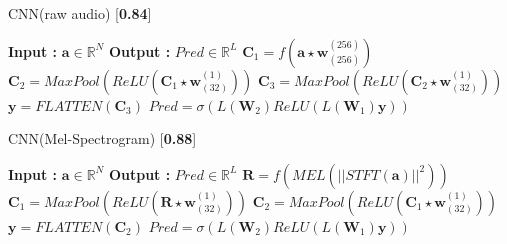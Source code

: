 \begin{minipage}[t]{7.5cm}
  \vspace{0pt}  
  \begin{algorithm}[H]
    \caption{CNN(raw audio) [\textbf{0.84}]}
    \begin{algorithmic}[1]
      \Statex \textbf{Input :} $\textbf{a} \in \mathbb{R}^{N}$
      \Statex \textbf{Output :} $Pred \in \mathbb{R}^{L}$ 
      \State $\textbf{C}_{1}  = f(\textbf{a}\star\textbf{w}_{(256)}^{(256)})$
      \State $\textbf{C}_{2} =  MaxPool(ReLU(\textbf{C}_{1}\star\textbf{w}_{(32)}^{(1)}))$
       \State $\textbf{C}_{3} = MaxPool(ReLU(\textbf{C}_{2}\star\textbf{w}_{(32)}^{(1)}))$
       \State $\textbf{y} = FLATTEN(\textbf{C}_{3})$
       \State $Pred = \sigma(L(\textbf{W}_{2})ReLU(L(\textbf{W}_{1})\textbf{y}))$
   \end{algorithmic}
  \end{algorithm}
\end{minipage}%
\begin{minipage}[t]{7.5cm}
  \vspace{0pt}
  \begin{algorithm}[H]
    \caption{CNN(Mel-Spectrogram) [\textbf{0.88}]}
     \begin{algorithmic}[1]
      \Statex \textbf{Input :} $\textbf{a} \in \mathbb{R}^{N}$
      \Statex \textbf{Output :} $Pred \in \mathbb{R}^{L}$ 
      \State $\textbf{R}  = f(MEL(||STFT(\textbf{a})||^{2}))$
      \State $\textbf{C}_{1} =  MaxPool(ReLU(\textbf{R}\star\textbf{w}_{(32)}^{(1)}))$
       \State $\textbf{C}_{2} = MaxPool(ReLU(\textbf{C}_{1}\star\textbf{w}_{(32)}^{(1)}))$
       \State $\textbf{y} = FLATTEN(\textbf{C}_{2})$
       \State $Pred = \sigma(L(\textbf{W}_{2})ReLU(L(\textbf{W}_{1})\textbf{y}))$
   \end{algorithmic}
  \end{algorithm}
\end{minipage}
\FloatBarrier
\bigskip

